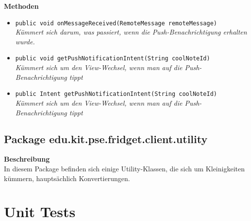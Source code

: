 \documentclass[a4paper]{scrreprt}
\begin{document}
\textbf{Methoden}
\begin{itemize}
	\item{\texttt{public void onMessageReceived(RemoteMessage remoteMessage)}}\\
	\textit{Kümmert sich darum, was passiert, wenn die Push-Benachrichtigung erhalten wurde.}\\
	\item{\texttt{public void getPushNotificationIntent(String coolNoteId)}}\\
	\textit{Kümmert sich um den View-Wechsel, wenn man auf die Push-Benachrichtigung tippt}\\
	\item{\texttt{public Intent getPushNotificationIntent(String coolNoteId)}}\\
	\textit{Kümmert sich um den View-Wechsel, wenn man auf die Push-Benachrichtigung tippt}\\
\end{itemize}

\section{Package edu.kit.pse.fridget.client.utility}
\textbf{Beschreibung} \\
In diesem Package befinden sich einige Utility-Klassen, die sich um Kleinigkeiten kümmern, hauptsächlich Konvertierungen.

		\chapter{Unit Tests}
		
\end{document}
